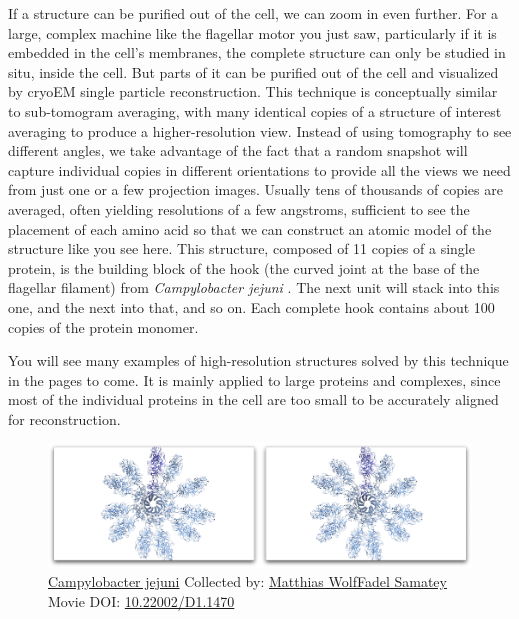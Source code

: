 \documentclass[]{tufte-book}
\begin{document}
If a structure can be purified out of the cell, we can zoom in even
further. For a large, complex machine like the flagellar motor you just
saw, particularly if it is embedded in the cell's membranes, the
complete structure can only be studied in situ, inside the cell. But
parts of it can be purified out of the cell and visualized by cryoEM
single particle reconstruction. This technique is conceptually similar
to sub-tomogram averaging, with many identical copies of a structure of
interest averaging to produce a higher-resolution view. Instead of using
tomography to see different angles, we take advantage of the fact that a
random snapshot will capture individual copies in different orientations
to provide all the views we need from just one or a few projection
images. Usually tens of thousands of copies are averaged, often yielding
resolutions of a few angstroms, sufficient to see the placement of each
amino acid so that we can construct an atomic model of the structure
like you see here. This structure, composed of 11 copies of a single
protein, is the building block of the hook (the curved joint at the base
of the flagellar filament) from \emph{Campylobacter jejuni}
\citep{matsunami2016}. The next unit will stack into this one, and the
next into that, and so on. Each complete hook contains about 100 copies
of the protein monomer.

You will see many examples of high-resolution structures solved by this
technique in the pages to come. It is mainly applied to large proteins
and complexes, since most of the individual proteins in the cell are too
small to be accurately aligned for reconstruction.






\begin{figure}
\includegraphics{movie_stills/1_8} \caption[\protect\hyperlink{tree}{Campylobacter jejuni} Collected by:
\protect\hyperlink{matthias_wolffadel_samatey}{Matthias WolfFadel
Samatey} Movie DOI:
\href{https://doi.org/10.22002/D1.1470}{10.22002/D1.1470}]{\protect\hyperlink{tree}{Campylobacter jejuni} Collected by:
\protect\hyperlink{matthias_wolffadel_samatey}{Matthias WolfFadel
Samatey} Movie DOI:
\href{https://doi.org/10.22002/D1.1470}{10.22002/D1.1470}}\label{fig:1-8}
\end{figure}
\end{document}

